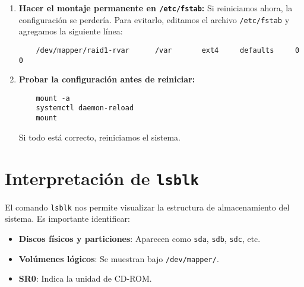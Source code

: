 \begin{enumerate}
    \item \textbf{Hacer el montaje permanente en \texttt{/etc/fstab}:}  
    Si reiniciamos ahora, la configuración se perdería. Para evitarlo, editamos el archivo \texttt{/etc/fstab} y agregamos la siguiente línea:
    \begin{verbatim}
    /dev/mapper/raid1-rvar      /var       ext4     defaults     0 0
    \end{verbatim}
    
    \item \textbf{Probar la configuración antes de reiniciar:}  
    \begin{verbatim}
    mount -a
    systemctl daemon-reload
    mount
    \end{verbatim}
    Si todo está correcto, reiniciamos el sistema.
\end{enumerate}

\section{Interpretación de \texttt{lsblk}}

El comando \texttt{lsblk} nos permite visualizar la estructura de almacenamiento del sistema. Es importante identificar:

\begin{itemize}
    \item \textbf{Discos físicos y particiones}: Aparecen como \texttt{sda}, \texttt{sdb}, \texttt{sdc}, etc.
    \item \textbf{Volúmenes lógicos}: Se muestran bajo \texttt{/dev/mapper/}.
    \item \textbf{SR0}: Indica la unidad de CD-ROM.
\end{itemize}
